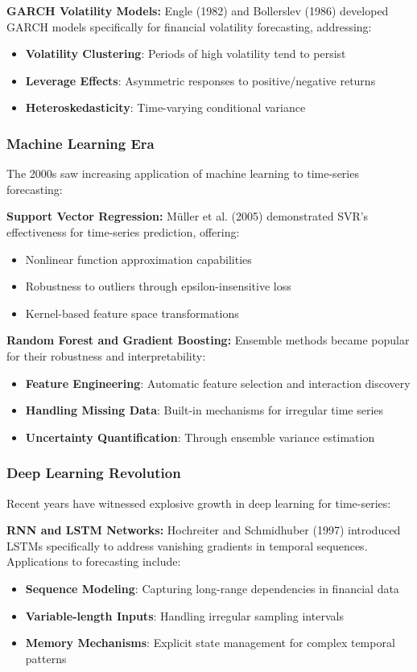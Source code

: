\documentclass[conference]{IEEEtran}
\begin{document}
\textbf{GARCH Volatility Models:}
Engle (1982) and Bollerslev (1986) developed GARCH models specifically for financial volatility forecasting, addressing:
\begin{itemize}
  \item \textbf{Volatility Clustering}: Periods of high volatility tend to persist
  \item \textbf{Leverage Effects}: Asymmetric responses to positive/negative returns
  \item \textbf{Heteroskedasticity}: Time-varying conditional variance
\end{itemize}

\subsubsection{Machine Learning Era}
The 2000s saw increasing application of machine learning to time-series forecasting:

\textbf{Support Vector Regression:}
Müller et al. (2005) demonstrated SVR's effectiveness for time-series prediction, offering:
\begin{itemize}
  \item Nonlinear function approximation capabilities
  \item Robustness to outliers through epsilon-insensitive loss
  \item Kernel-based feature space transformations
\end{itemize}

\textbf{Random Forest and Gradient Boosting:}
Ensemble methods became popular for their robustness and interpretability:
\begin{itemize}
  \item \textbf{Feature Engineering}: Automatic feature selection and interaction discovery
  \item \textbf{Handling Missing Data}: Built-in mechanisms for irregular time series
  \item \textbf{Uncertainty Quantification}: Through ensemble variance estimation
\end{itemize}

\subsubsection{Deep Learning Revolution}
Recent years have witnessed explosive growth in deep learning for time-series:

\textbf{RNN and LSTM Networks:}
Hochreiter and Schmidhuber (1997) introduced LSTMs specifically to address vanishing gradients in temporal sequences. Applications to forecasting include:
\begin{itemize}
  \item \textbf{Sequence Modeling}: Capturing long-range dependencies in financial data
  \item \textbf{Variable-length Inputs}: Handling irregular sampling intervals
  \item \textbf{Memory Mechanisms}: Explicit state management for complex temporal patterns
\end{itemize}
\end{document}
